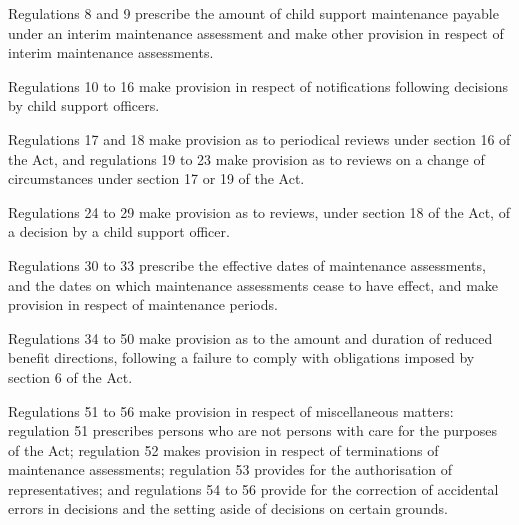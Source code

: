\documentclass[a4paper,12pt]{article}
\begin{document}
  Regulations 8 and 9 prescribe the amount of child support maintenance payable under an interim maintenance assessment and make other provision in respect of interim maintenance assessments.

  Regulations 10 to 16 make provision in respect of notifications following decisions by child support officers.

  Regulations 17 and 18 make provision as to periodical reviews under section 16 of the Act, and regulations 19 to 23 make provision as to reviews on a change of circumstances under section 17 or 19 of the Act.

  Regulations 24 to 29 make provision as to reviews, under section 18 of the Act, of a decision by a child support officer.

  Regulations 30 to 33 prescribe the effective dates of maintenance assessments, and the dates on which maintenance assessments cease to have effect, and make provision in respect of maintenance periods.

  Regulations 34 to 50 make provision as to the amount and duration of reduced benefit directions, following a failure to comply with obligations imposed by section 6 of the Act.

  Regulations 51 to 56 make provision in respect of miscellaneous matters: regulation 51 prescribes persons who are not persons with care for the purposes of the Act; regulation 52 makes provision in respect of terminations of maintenance assessments; regulation 53 provides for the authorisation of representatives; and regulations 54 to 56 provide for the correction of accidental errors in decisions and the setting aside of decisions on certain grounds.
\end{document}

